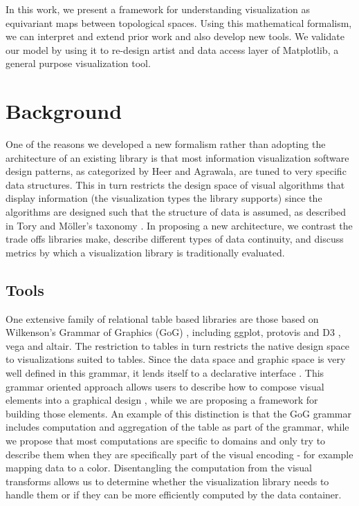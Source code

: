 \documentclass[../main.tex]{subfiles}
\begin{document}
In this work, we present a framework for understanding visualization as equivariant maps between topological spaces. Using this mathematical formalism, we can interpret and extend prior work and also develop new tools. We validate our model by using it to re-design artist and data access layer of Matplotlib, a general purpose visualization tool.
 

\section{Background}
One of the reasons we developed a new formalism rather than adopting the architecture of an existing library is that most information visualization software design patterns, as categorized by Heer and Agrawala\cite{HeerSoftware2006}, are tuned to very specific data structures. This in turn restricts the design space of visual algorithms that display information (the visualization types the library supports) since the algorithms are designed such that the structure of data is assumed, as described in Tory and Möller's taxonomy \cite{ToryRethinkingVisualization2004}. In proposing a new architecture, we contrast the trade offs libraries make, describe different types of data continuity, and discuss metrics by which a visualization library is traditionally evaluated. 

\subsection{Tools}
\label{sec:intro_data_tools}
One extensive family of relational table based libraries are those based on Wilkenson's Grammar of Graphics (GoG) \cite{wilkinsonGrammarGraphics2005}, including ggplot\cite{wickhamGgplot2ElegantGraphics2016a}, protovis\cite{bostockProtoviz2009} and D3 \cite{bostockDataDrivenDocuments2011}, vega\cite{satyanarayanDeclarativeInteractionDesign2014} and altair\cite{vanderplasAltairInteractiveStatistical2018}. The restriction to tables in turn restricts the native design space to visualizations suited to tables. Since the data space and graphic space is very well defined in this grammar, it lends itself to a declarative interface \cite{heerDeclarative2010}. This grammar oriented approach allows users to describe how to compose visual elements into a graphical design \cite{wongsuphasawatNavigatingWideWorld2021}, while we are proposing a framework for building those elements. An example of this distinction is that the GoG grammar includes computation and aggregation of the table as part of the grammar, while we propose that most computations are specific to domains and only try to describe them when they are specifically part of the visual encoding - for example mapping data to a color. Disentangling the computation from the visual transforms allows us to determine whether the visualization library needs to handle them or if they can be more efficiently computed by the data container.
\end{document}
